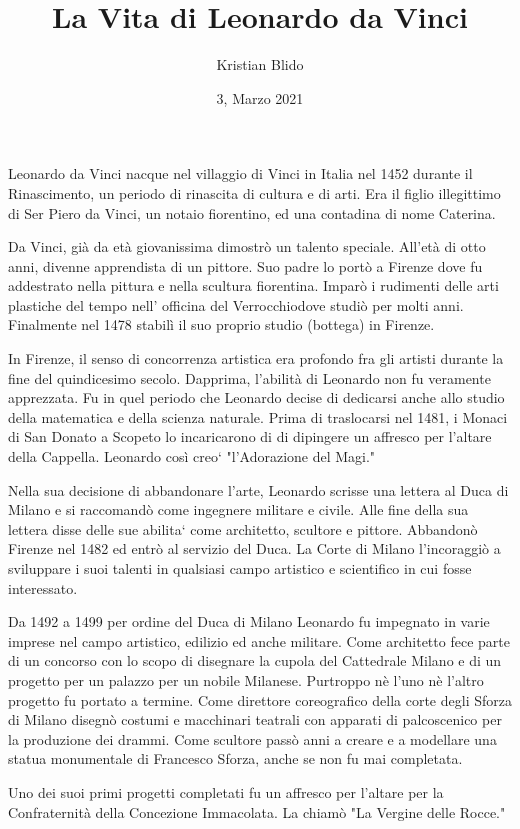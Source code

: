 \documentclass[12pt, a4]{article}
\title{La Vita di Leonardo da Vinci}
\author{Kristian Blido}
\date{3, Marzo 2021}
\begin{document}
\maketitle


    Leonardo da Vinci nacque nel villaggio di Vinci in Italia nel 1452 durante il Rinascimento, un periodo di rinascita di cultura e di arti. Era il figlio illegittimo di Ser Piero da Vinci, un notaio fiorentino, ed una contadina di nome Caterina.

    Da Vinci, già da età giovanissima dimostrò un talento speciale. All'età di otto anni, divenne apprendista di un pittore. Suo padre lo portò a Firenze dove fu addestrato nella pittura e nella scultura fiorentina. Imparò i rudimenti delle arti plastiche del tempo nell' officina del Verrocchiodove studiò per molti anni. Finalmente nel 1478 stabilì il suo proprio studio (bottega) in Firenze.

    In Firenze, il senso di concorrenza artistica era profondo fra gli artisti durante la fine del quindicesimo secolo. Dapprima, l'abilità di Leonardo non fu veramente apprezzata. Fu in quel periodo che Leonardo decise di dedicarsi anche allo studio della matematica e della scienza naturale. Prima di traslocarsi nel 1481, i Monaci di San Donato a Scopeto lo incaricarono di di dipingere un affresco per l'altare della Cappella. Leonardo così creo` "l'Adorazione del Magi."

    Nella sua decisione di abbandonare l'arte, Leonardo scrisse una lettera al Duca di Milano e si raccomandò come ingegnere militare e civile. Alle fine della sua lettera disse delle sue abilita` come architetto, scultore e pittore. Abbandonò Firenze nel 1482 ed entrò al servizio del Duca. La Corte di Milano l'incoraggiò a sviluppare i suoi talenti in qualsiasi campo artistico e scientifico in cui fosse interessato.

    Da 1492 a 1499 per ordine del Duca di Milano Leonardo fu impegnato in varie imprese nel campo artistico, edilizio ed anche militare. Come architetto fece parte di un concorso con lo scopo di disegnare la cupola del Cattedrale Milano e di un progetto per un palazzo per un nobile Milanese. Purtroppo nè l'uno nè l'altro progetto fu portato a termine. Come direttore coreografico della corte degli Sforza di Milano disegnò costumi e macchinari teatrali con apparati di palcoscenico per la produzione dei drammi. Come scultore passò anni a creare e a modellare una statua monumentale di Francesco Sforza, anche se non fu mai completata.

    Uno dei suoi primi progetti completati fu un affresco per l'altare per la Confraternità della Concezione Immacolata. La chiamò "La Vergine delle Rocce."
\end{document}
